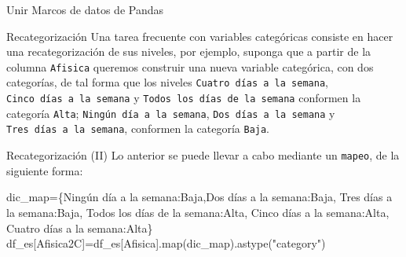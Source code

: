 \documentclass[
  ignorenonframetext,
  aspectratio=169,
  spanish,
]{beamer}
\newenvironment{Shaded}{\begin{snugshade}}{\end{snugshade}}
\newcommand{\BuiltInTok}[1]{\textcolor[rgb]{0.00,0.23,0.31}{#1}}
\newcommand{\NormalTok}[1]{\textcolor[rgb]{0.00,0.23,0.31}{#1}}
\newcommand{\OperatorTok}[1]{\textcolor[rgb]{0.37,0.37,0.37}{#1}}
\newcommand{\StringTok}[1]{\textcolor[rgb]{0.13,0.47,0.30}{#1}}
\newcommand*\circled[1]{\tikz[baseline=(char.base)]{
          \node[shape=circle,draw,inner sep=1pt] (char) {{\scriptsize#1}};}}
\begin{document}
\begin{frame}[fragile]{Unir Marcos de datos de Pandas}
\begin{block}{Recategorización}
\label{recategorizaciuxf3n}
Una tarea frecuente con variables categóricas consiste en hacer una
recategorización de sus niveles, por ejemplo, suponga que a partir de la
columna \texttt{Afisica} queremos construir una nueva variable
categórica, con dos categorías, de tal forma que los niveles
\texttt{Cuatro\ días\ a\ la\ semana},
\texttt{Cinco\ días\ a\ la\ semana} y
\texttt{Todos\ los\ días\ de\ la\ semana} conformen la categoría
\texttt{Alta}; \texttt{Ningún\ día\ a\ la\ semana},
\texttt{Dos\ días\ a\ la\ semana} y \texttt{Tres\ días\ a\ la\ semana},
conformen la categoría \texttt{Baja}.
\end{block}

\begin{block}{Recategorización (II)}
\label{recategorizaciuxf3n-ii}
Lo anterior se puede llevar a cabo mediante un \texttt{mapeo}, de la
siguiente forma:

\label{annotated-cell-59}%
\begin{Shaded}
\begin{Highlighting}[]
\NormalTok{dic\_map}\OperatorTok{=}\NormalTok{\{}\StringTok{\textquotesingle{}Ningún día a la semana\textquotesingle{}}\NormalTok{:}\StringTok{\textquotesingle{}Baja\textquotesingle{}}\NormalTok{,}\StringTok{\textquotesingle{}Dos días a la semana\textquotesingle{}}\NormalTok{:}\StringTok{\textquotesingle{}Baja\textquotesingle{}}\NormalTok{,}
\StringTok{\textquotesingle{}Tres días a la semana\textquotesingle{}}\NormalTok{:}\StringTok{\textquotesingle{}Baja\textquotesingle{}}\NormalTok{,}
\StringTok{\textquotesingle{}Todos los días de la semana\textquotesingle{}}\NormalTok{:}\StringTok{\textquotesingle{}Alta\textquotesingle{}}\NormalTok{,}
\StringTok{\textquotesingle{}Cinco días a la semana\textquotesingle{}}\NormalTok{:}\StringTok{\textquotesingle{}Alta\textquotesingle{}}\NormalTok{,}
\StringTok{\textquotesingle{}Cuatro días a la semana\textquotesingle{}}\NormalTok{:}\StringTok{\textquotesingle{}Alta\textquotesingle{}}\NormalTok{\} }\hspace*{\fill}\NormalTok{\circled{1}}
\NormalTok{df\_es[}\StringTok{\textquotesingle{}Afisica2C\textquotesingle{}}\NormalTok{]}\OperatorTok{=}\NormalTok{df\_es[}\StringTok{\textquotesingle{}Afisica\textquotesingle{}}\NormalTok{].}\BuiltInTok{map}\NormalTok{(dic\_map).astype(}\StringTok{"category"}\NormalTok{) }\hspace*{\fill}\NormalTok{\circled{2}}


\end{Highlighting}
\end{Shaded}
\end{block}
\end{frame}
\end{document}
